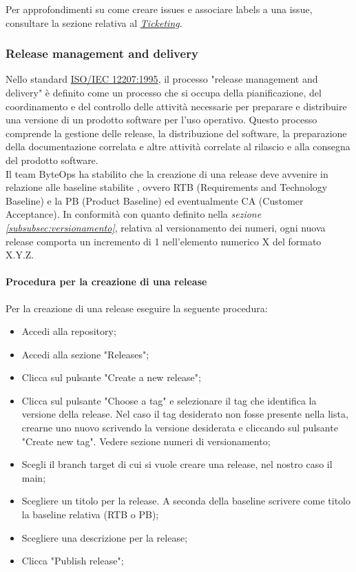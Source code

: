 Per approfondimenti su come creare issues e associare labels a una issue, consultare la sezione relativa al \hyperlink{par:ticketing}{\textit{Ticketing}}.

\subsubsection{Release management and delivery} 
Nello standard \href{https://www.math.unipd.it/~tullio/IS-1/2009/Approfondimenti/ISO_12207-1995.pdf}{ISO/IEC 12207:1995}, il processo "release management and delivery" è definito come un processo che si occupa della pianificazione, del coordinamento e del controllo delle attività necessarie per preparare e distribuire una versione di un prodotto software per l'uso operativo. Questo processo comprende la gestione delle release, la distribuzione del software, la preparazione della documentazione correlata e altre attività correlate al rilascio e alla consegna del prodotto software. \\
Il team ByteOps ha stabilito che la creazione di una release deve avvenire in relazione alle baseline stabilite , ovvero RTB (Requirements and Technology Baseline) e la PB (Product Baseline) ed eventualmente CA (Customer Acceptance). In conformità con quanto definito nella \textit{sezione \ref{subsubsec:versionamento}}, relativa al versionamento dei numeri, ogni nuova release comporta un incremento di 1 nell'elemento numerico X del formato X.Y.Z.

\paragraph{Procedura per la creazione di una release}
Per la creazione di una release eseguire la seguente procedura:
\begin{itemize}
    \item Accedi alla repository;
    \item Accedi alla sezione "Releases";
    \item Clicca sul pulsante "Create a new release";
    \item Clicca sul pulsante "Choose a tag" e selezionare il tag che identifica la versione della release. Nel caso il tag desiderato non fosse presente nella lista, crearne uno nuovo scrivendo la versione desiderata e cliccando sul pulsante "Create new tag". Vedere sezione numeri di versionamento;
    \item Scegli il branch target di cui si vuole creare una release, nel nostro caso il main;
    \item Scegliere un titolo per la release. A seconda della baseline scrivere come titolo la baseline relativa (RTB o PB);
    \item Scegliere una descrizione per la release;
    \item Clicca "Publish release";
\end{itemize}

